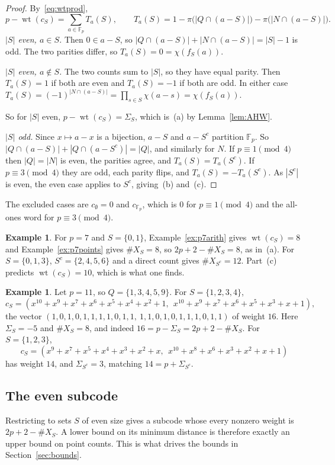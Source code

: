 \documentclass[12pt,letterpaper]{article}
\theoremstyle{definition}
\newtheorem{example}[theorem]{Example}
\theoremstyle{remark}
\numberwithin{equation}{section}
\newcommand{\Fp}{\mathbb{F}_p}
\newcommand{\wt}{\operatorname{wt}}
\newcommand{\X}{\#X}
\begin{document}
\begin{proof}
By~\eqref{eq:wtprod},
\[
p-\wt(c_S)=\sum_{a\in\Fp}T_a(S),\qquad
T_a(S)=1-\pi\big(|Q\cap(a-S)|\big)-\pi\big(|N\cap(a-S)|\big).
\]
\emph{$|S|$ even, $a\in S$.} Then $0\in a-S$, so
$|Q\cap(a-S)|+|N\cap(a-S)|=|S|-1$ is odd. The two parities differ, so
$T_a(S)=0=\chi(f_S(a))$.

\emph{$|S|$ even, $a\notin S$.} The two counts sum to $|S|$, so they have equal
parity. Then $T_a(S)=1$ if both are even and $T_a(S)=-1$ if both are odd. In
either case $T_a(S)=(-1)^{|N\cap(a-S)|}=\prod_{s\in S}\chi(a-s)=\chi(f_S(a))$.

So for $|S|$ even, $p-\wt(c_S)=\Sigma_S$, which is~(a) by Lemma~\ref{lem:AHW}.

\emph{$|S|$ odd.} Since $x\mapsto a-x$ is a bijection, $a-S$ and $a-S^c$ partition
$\Fp$. So $|Q\cap(a-S)|+|Q\cap(a-S^c)|=|Q|$, and similarly for $N$. If
$p\equiv1\pmod4$ then $|Q|=|N|$ is even, the parities agree, and
$T_a(S)=T_a(S^c)$. If $p\equiv3\pmod4$ they are odd, each parity flips, and
$T_a(S)=-T_a(S^c)$. As $|S^c|$ is even, the even case applies to $S^c$, giving~(b)
and~(c).
\end{proof}

The excluded cases are $c_\emptyset=0$ and $c_{\Fp}$, which is $0$ for
$p\equiv1\pmod4$ and the all-ones word for $p\equiv3\pmod 4$.

\begin{example}\label{ex:p7weights}
For $p=7$ and $S=\{0,1\}$, Example~\ref{ex:p7arith} gives $\wt(c_S)=8$ and
Example~\ref{ex:p7points} gives $\X_S=8$, so $2p+2-\X_S=8$, as in~(a). For
$S=\{0,1,3\}$, $S^c=\{2,4,5,6\}$ and a direct count gives $\X_{S^c}=12$. Part~(c)
predicts $\wt(c_S)=10$, which is what one finds.
\end{example}

\begin{example}\label{ex:p11}
Let $p=11$, so $Q=\{1,3,4,5,9\}$. For $S=\{1,2,3,4\}$,
\[
c_S=(x^{10}+x^9+x^7+x^6+x^5+x^4+x^2+1,\ \ x^{10}+x^9+x^7+x^6+x^5+x^3+x+1),
\]
the vector $(1,0,1,0,1,1,1,1,0,1,1,\ 1,1,0,1,0,1,1,1,0,1,1)$ of weight $16$. Here
$\Sigma_S=-5$ and $\X_S=8$, and indeed $16=p-\Sigma_S=2p+2-\X_S$. For $S=\{1,2,3\}$,
\[
c_S=(x^9+x^7+x^5+x^4+x^3+x^2+x,\ \ x^{10}+x^8+x^6+x^3+x^2+x+1)
\]
has weight $14$, and $\Sigma_{S^c}=3$, matching $14=p+\Sigma_{S^c}$.
\end{example}

\subsection{The even subcode}
Restricting to sets $S$ of even size gives a subcode whose every nonzero weight is
$2p+2-\X_S$. A lower bound on its minimum distance is therefore exactly an upper
bound on point counts. This is what drives the bounds in Section~\ref{sec:bounds}.
\end{document}
